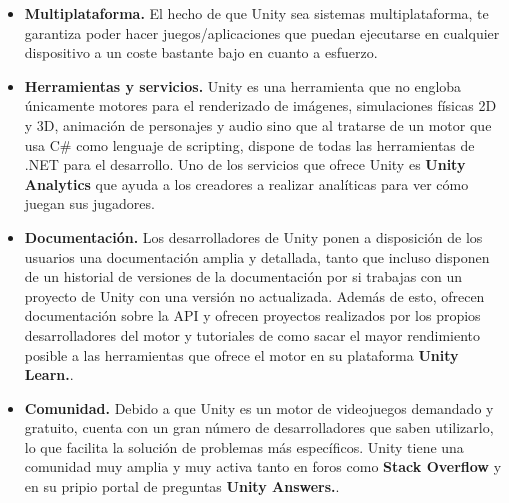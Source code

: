 \begin{itemize}
\item \textbf{Multiplataforma.} El hecho de que Unity sea sistemas multiplataforma, te garantiza poder hacer juegos/aplicaciones que puedan ejecutarse en cualquier dispositivo a un coste bastante bajo en cuanto a esfuerzo.

\item  \textbf{Herramientas y servicios.} Unity es una herramienta que no engloba \'unicamente motores para el renderizado de im\'agenes, simulaciones f\'isicas 2D y 3D, animaci\'on de personajes y audio sino que al tratarse de un motor que usa C\#  como lenguaje de scripting, dispone de todas las herramientas de .NET para el desarrollo. Uno de los servicios que ofrece Unity es \textbf{Unity Analytics} que ayuda a los creadores a realizar anal\'iticas para ver c\'omo juegan sus jugadores.

\item  \textbf{Documentaci\'on.} Los desarrolladores de Unity ponen a disposici\'on de los usuarios una documentaci\'on amplia y detallada, tanto que incluso disponen de un historial de versiones de la documentaci\'on por si trabajas con un proyecto de Unity con una versi\'on no actualizada. Adem\'as de esto, ofrecen documentaci\'on sobre la API y ofrecen proyectos realizados por los propios desarrolladores del motor y tutoriales de como sacar el mayor rendimiento posible a las herramientas que ofrece el motor en su plataforma \textbf{Unity Learn.}.

\item  \textbf{Comunidad.} Debido a que Unity es un motor de videojuegos demandado y gratuito, cuenta con un gran n\'umero de desarrolladores que saben utilizarlo, lo que facilita la soluci\'on de problemas m\'as espec\'ificos. Unity tiene una comunidad muy amplia y muy activa tanto en foros como \textbf{Stack Overflow} y en su pripio portal de preguntas \textbf{Unity Answers.}.
\end{itemize}


